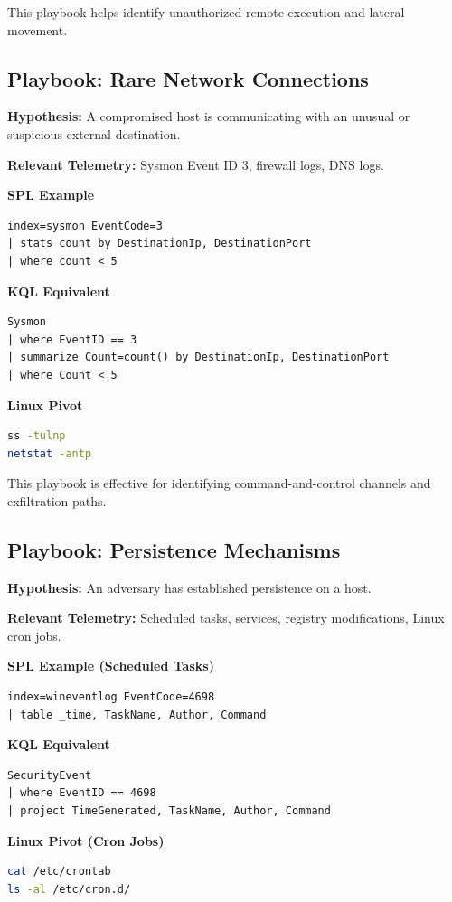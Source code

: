 This playbook helps identify unauthorized remote execution and lateral movement.

\subsection*{Playbook: Rare Network Connections}

\textbf{Hypothesis:} A compromised host is communicating with an unusual or suspicious external destination.

\textbf{Relevant Telemetry:} Sysmon Event ID 3, firewall logs, DNS logs.

\textbf{SPL Example}
\begin{lstlisting}
index=sysmon EventCode=3
| stats count by DestinationIp, DestinationPort
| where count < 5
\end{lstlisting}

\textbf{KQL Equivalent}
\begin{lstlisting}
Sysmon
| where EventID == 3
| summarize Count=count() by DestinationIp, DestinationPort
| where Count < 5
\end{lstlisting}

\textbf{Linux Pivot}
\begin{lstlisting}[language=bash]
ss -tulnp
netstat -antp
\end{lstlisting}

This playbook is effective for identifying command-and-control channels and exfiltration paths.

\subsection*{Playbook: Persistence Mechanisms}

\textbf{Hypothesis:} An adversary has established persistence on a host.

\textbf{Relevant Telemetry:} Scheduled tasks, services, registry modifications, Linux cron jobs.

\textbf{SPL Example (Scheduled Tasks)}
\begin{lstlisting}
index=wineventlog EventCode=4698
| table _time, TaskName, Author, Command
\end{lstlisting}

\textbf{KQL Equivalent}
\begin{lstlisting}
SecurityEvent
| where EventID == 4698
| project TimeGenerated, TaskName, Author, Command
\end{lstlisting}

\textbf{Linux Pivot (Cron Jobs)}
\begin{lstlisting}[language=bash]
cat /etc/crontab
ls -al /etc/cron.d/
\end{lstlisting}

